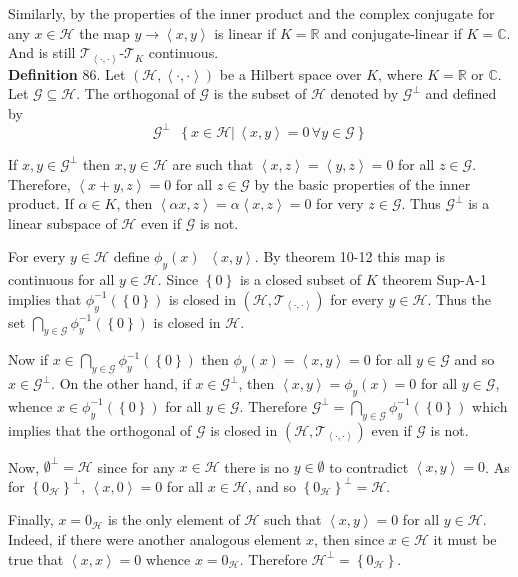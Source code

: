 \documentclass[a4paper]{article}
\newcommand{\obj}[1]{\left\{ #1 \right \}}
\newcommand{\brac}[1]{\left ( #1 \right )}
\newcommand{\induc}[1]{\left . #1 \right \vert}
\newcommand{\brkt}[1]{\left\langle #1 \right\rangle}
\newcommand{\Real}{\mathbb{R}}
\newcommand{\Cplx}{\mathbb{C}}
\newcommand{\Tcal}{\mathcal{T}}
\newcommand{\Hcal}{\mathcal{H}}
\newcommand{\defn}{\mathop{\overset{\Delta}{=}}\nolimits}
\begin{document}
Similarly, by the properties of the inner product and the complex conjugate for any $x\in \Hcal$ the map $y\to\brkt{x,y}$ is linear if $K=\Real$ and conjugate-linear if $K=\Cplx$. And is still $\Tcal_{\brkt{\cdot,\cdot}}$-$\Tcal_K$ continuous.\\

\noindent \textbf{Definition} 86.
Let $\brac{\Hcal, \brkt{\cdot,\cdot}}$ be a Hilbert space over $K$, where $K=\Real$ or $\Cplx$. Let $\mathcal{G}\subseteq \Hcal$. The orthogonal of $\mathcal{G}$ is the subset of $\Hcal$ denoted by $\mathcal{G}^\perp$ and defined by \[\mathcal{G}^\perp \defn \obj{\induc{ x\in \Hcal}\,\brkt{x,y}=0\,\forall y\in \mathcal{G}}\]

If $x,y\in \mathcal{G}^\perp$ then $x,y\in \Hcal$ are such that $\brkt{x,z}=\brkt{y,z}=0$ for all $z\in \mathcal{G}$. Therefore, $\brkt{x+y,z}=0$ for all $z\in \mathcal{G}$ by the basic properties of the inner product. If $\alpha\in K$, then $\brkt{\alpha x, z}=\alpha \brkt{x,z} = 0$ for very $z\in \mathcal{G}$. Thus $\mathcal{G}^\perp$ is a linear subspace of $\Hcal$ even if $\mathcal{G}$ is not.

For every $y\in \Hcal$ define $\phi_y\brac{x}\defn \brkt{x,y}$. By theorem 10-12 this map is continuous for all $y\in \Hcal$. Since $\obj{0}$ is a closed subset of $K$ theorem Sup-A-1 implies that $\phi_y^{-1}\brac{\obj{0}}$ is closed in $\brac{\Hcal, \Tcal_{\brkt{\cdot, \cdot}}}$ for every $y\in \Hcal$. Thus the set $\bigcap_{y\in \mathcal{G}} \phi_y^{-1}\brac{\obj{0}}$ is closed in $\Hcal$.

Now if $x\in \bigcap_{y\in \mathcal{G}} \phi_y^{-1}\brac{\obj{0}}$ then $\phi_y\brac{x} = \brkt{x,y} = 0$ for all $y\in \mathcal{G}$ and so $x\in \mathcal{G}^\perp$. On the other hand, if $x\in \mathcal{G}^\perp$, then $\brkt{x,y}=\phi_y\brac{x} = 0$ for all $y\in \mathcal{G}$, whence $x\in \phi_y^{-1}\brac{\obj{0}}$ for all $y\in \mathcal{G}$. Therefore $\mathcal{G}^\perp = \bigcap_{y\in \mathcal{G}} \phi_y^{-1}\brac{\obj{0}}$ which implies that the orthogonal of $\mathcal{G}$ is closed in $\brac{\Hcal, \Tcal_{\brkt{\cdot, \cdot}}}$ even if $\mathcal{G}$ is not.

Now, $\emptyset^\perp = \Hcal$ since for any $x\in \Hcal$ there is no $y\in \emptyset$ to contradict $\brkt{x,y}=0$. As for $\obj{0_\Hcal}^\perp$, $\brkt{x,0}=0$ for all $x\in \Hcal$, and so $\obj{0_\Hcal}^\perp = \Hcal$.

Finally, $x=0_\Hcal$ is the only element of $\Hcal$ such that $\brkt{x,y}=0$ for all $y\in \Hcal$. Indeed, if there were another analogous element $x$, then since $x\in \Hcal$ it must be true that $\brkt{x,x}=0$ whence $x=0_\Hcal$. Therefore $\Hcal^\perp = \obj{0_\Hcal}$.
\end{document}
